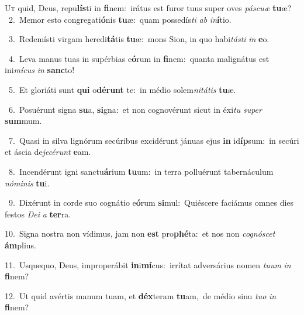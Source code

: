 \lettrine{\initial\textcolor{\initialcolor}{U}}{t} quid, Deus, repu\-\textbf{lís}\-ti in \textbf{fi}\-nem:~\star irátus est furor tuus super oves \textit{pás}\-\textit{cu}\textit{æ} \textbf{tu}\-æ?\\
{\numbfont\textcolor{\numbcolor}{~2.}}~Memor esto congregati\-\textbf{ó}\-nis \textbf{tu}\-æ:~\star quam possedís\textit{ti} \textit{ab} \textit{in}\-\textbf{í}tio.\par
{\numbfont\textcolor{\numbcolor}{~3.}}~Redemísti virgam heredi\-\textbf{tá}\-tis \textbf{tu}\-æ:~\star mons Sion, in quo habi\-\textit{tás}\-\textit{ti} \textit{in} \textbf{e}\-o.\par
{\numbfont\textcolor{\numbcolor}{~4.}}~Leva manus tuas in supérbias e\-\textbf{ó}\-rum in \textbf{fi}\-nem:~\star quanta malignátus est ini\-\textit{mí}\-\textit{cus} \textit{in} \textbf{sanc}\-to!\par
{\numbfont\textcolor{\numbcolor}{~5.}}~Et gloriáti sunt \textbf{qui} o\-\textbf{dé}\-\textbf{runt} te:~\star in médio solem\-\textit{ni}\-\textit{tá}\textit{tis} \textbf{tu}\-æ.\par
{\numbfont\textcolor{\numbcolor}{~6.}}~Posuérunt signa \textbf{su}\-a, \textbf{si}\-gna:~\star et non cognovérunt sicut in éxi\textit{tu} \textit{su}\-\textit{per} \textbf{sum}\-mum.\par
{\numbfont\textcolor{\numbcolor}{~7.}}~Quasi in silva lignórum secúribus excidérunt jánuas ejus \textbf{in} id\-\textbf{íp}\-sum:~\star in secúri et áscia de\-\textit{je}\-\textit{cé}\textit{runt} \textbf{e}\-am.\par
{\numbfont\textcolor{\numbcolor}{~8.}}~Incendérunt igni sanctu\-\textbf{á}\-rium \textbf{tu}\-um:~\star in terra polluérunt tabernáculum \textit{nó}\-\textit{mi}\textit{nis} \textbf{tu}\-i.\par
{\numbfont\textcolor{\numbcolor}{~9.}}~Dixérunt in corde suo cognátio e\-\textbf{ó}\-rum \textbf{si}\-mul:~\star Quiéscere faciámus omnes dies festos \textit{De}\-\textit{i} \textit{a} \textbf{ter}\-ra.\par
{\numbfont\textcolor{\numbcolor}{10.}}~Signa nostra non vídimus, jam non \textbf{est} pro\-\textbf{phé}\-ta:~\star et nos non \textit{co}\-\textit{gnó}\textit{scet} \textbf{ám}\-plius.\par
{\numbfont\textcolor{\numbcolor}{11.}}~Usquequo, Deus, improperábit \textbf{in}\-i\-\textbf{mí}\-cus:~\star irrítat adversárius nomen \textit{tu}\-\textit{um} \textit{in} \textbf{fi}\-nem?\par
{\numbfont\textcolor{\numbcolor}{12.}}~Ut quid avértis manum tuam, et \textbf{déx}\-teram \textbf{tu}\-am,~\star de médio sinu \textit{tu}\-\textit{o} \textit{in} \textbf{fi}\-nem?\par
